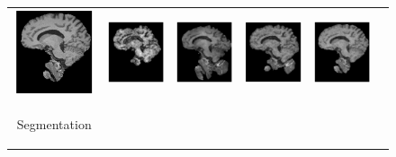 \documentclass[10pt,journal,compsoc]{IEEEtran}
\begin{document}
\begin{figure}[ht]
\begin{raggedleft}
\begin{tabular}{cccccc}
			\includegraphics[width=2.5cm,height=2.5cm]{include/grp2/factor6/022-Guys-0701-T1/022-Guys-0701-T1_brains__50} &
			\includegraphics[width=2.5cm,height=2.5cm]{include/grp2/factor6/022-Guys-0701-T1/022-Guys-0701-T1_brains__zeroPadding_50} & \includegraphics[width=2.5cm,height=2.5cm]{include/grp2/factor6/022-Guys-0701-T1/022-Guys-0701-T1_brains__CS_50} & \includegraphics[width=2.5cm,height=2.5cm]{include/grp2/factor6/022-Guys-0701-T1/022-Guys-0701-T1_brains__IMCNNL2TUNE_50} & \includegraphics[width=2.5cm,height=2.5cm]{include/grp2/factor6/022-Guys-0701-T1/022-Guys-0701-T1_brains__predict_50}
			
			\tabularnewline
			
			\multirow{2}{0.05cm}[1.7cm]{\begin{turn}{90} {\footnotesize Segmentation} \end{turn}} &
			

\end{tabular}
\end{raggedleft}
\end{figure}
\end{document}
